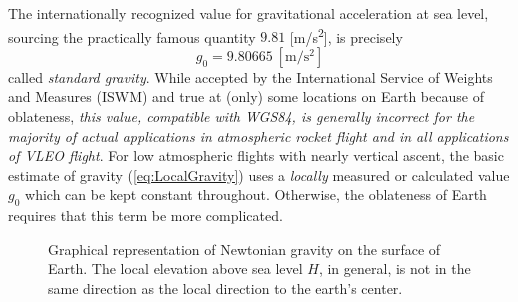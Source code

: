 \documentclass[11pt,dvipsnames]{thesis}
\begin{document}
The internationally recognized value for gravitational acceleration at sea level, sourcing the practically famous quantity $9.81$ [\si{\m/\s\squared}], is precisely
\begin{equation}
g_0 = 9.80665 \ [\si{\m/\s\squared}] \label{eq:AverageSeaValueGravity}
\end{equation}
called \textit{standard gravity}. While accepted by the International Service of Weights and Measures (ISWM) and true at (only) some locations on Earth because of oblateness, \textit{this value, compatible with WGS84, is generally incorrect for the majority of actual applications in atmospheric rocket flight and in all applications of VLEO flight}.
For low atmospheric flights with nearly vertical ascent, the basic estimate of gravity (\ref{eq:LocalGravity}) uses a \textit{locally} measured or calculated value $g_0$ which can be kept constant throughout. Otherwise, the oblateness of Earth requires that this term be more complicated.
\begin{figure}[H]
\centering
{}
\caption{Graphical representation of Newtonian gravity on the surface of Earth. The local elevation above sea level $H$, in general, is not in the same direction as the local direction to the earth's center.}
\label{fig:LocalGravity}
\end{figure}
\end{document}
